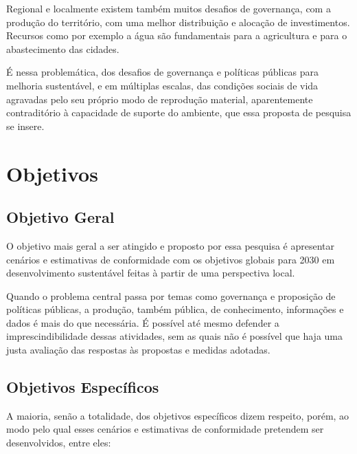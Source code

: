 \documentclass[
	12pt,				%
	openany,			%
	oneside,			%
	a4paper,			%
	english,			%
	french,				%
	spanish,			%
	brazil,				%
	]{abntex2}
\begin{document}
Regional e localmente existem também muitos desafios de governança, com a produção do território, com uma melhor distribuição e alocação de investimentos. Recursos como por exemplo a água são fundamentais para a agricultura e para o abastecimento das cidades.

É nessa problemática, dos desafios de governança e políticas públicas para melhoria sustentável, e em múltiplas escalas, das condições sociais de vida agravadas pelo seu próprio modo de reprodução material, aparentemente contraditório à capacidade de suporte do ambiente, que essa proposta de pesquisa se insere. 

\chapter{Objetivos}

\section{Objetivo Geral}


O objetivo mais geral a ser atingido e proposto por essa pesquisa é apresentar cenários e estimativas de conformidade \cite{patterson_exploring_2016} com os objetivos globais para 2030 em desenvolvimento sustentável \cite{united_nations_transforming_2015} feitas à partir de uma perspectiva local.

Quando o problema central passa por temas como governança e proposição de políticas públicas, a produção, também pública, de conhecimento, informações e dados é mais do que necessária. É possível até mesmo defender a imprescindibilidade dessas atividades, sem as quais não é possível que haja uma justa avaliação das respostas às propostas e medidas adotadas.


\section{Objetivos Específicos}

A maioria, senão a totalidade, dos objetivos específicos dizem respeito, porém, ao modo pelo qual esses cenários e estimativas de conformidade pretendem ser desenvolvidos, entre eles:
\end{document}

